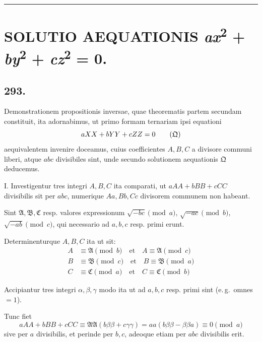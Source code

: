 \documentclass[12pt,a4paper]{article}
\theoremstyle{plain}
\theoremstyle{definition}
\theoremstyle{remark}
\begin{document}

\bigskip
\noindent\rule{\textwidth}{0.4pt}

\section*{SOLUTIO AEQUATIONIS \emph{ax}\textsuperscript{2} + \emph{by}\textsuperscript{2} + \emph{cz}\textsuperscript{2} = 0.}


\subsection*{293.}

Demonstrationem propositionis inversae, quae theorematis partem secundam
constituit, ita adornabimus, ut primo formam ternariam ipsi equationi
\begin{equation}\label{eq:Q}
aXX + bYY + cZZ = 0 \tag{$\mathfrak{Q}$}
\end{equation}
aequivalentem invenire doceamus, cuius coefficientes $A, B, C$ a divisore communi
liberi, atque $abc$ divisibiles sint, unde secundo solutionem aequationis $\mathfrak{Q}$
deducemus.

\textsc{I.} Investigentur tres integri $A, B, C$ ita comparati, ut $aAA + bBB + cCC$
divisibilis sit per $abc$, numerique $Aa, Bb, Cc$ divisorem communem non habeant.

Sint $\mathfrak{A}, \mathfrak{B}, \mathfrak{C}$ resp. valores expressionum
$\sqrt{-bc} \pmod{a}$, $\sqrt{-ac} \pmod{b}$, $\sqrt{-ab} \pmod{c}$, qui necessario ad
$a, b, c$ resp. primi erunt.

Determinenturque $A, B, C$ ita ut sit:
\begin{align*}
A &\equiv \mathfrak{A} \pmod{b} \quad\text{et}\quad A \equiv \mathfrak{A} \pmod{c} \\
B &\equiv \mathfrak{B} \pmod{c} \quad\text{et}\quad B \equiv \mathfrak{B} \pmod{a} \\
C &\equiv \mathfrak{C} \pmod{a} \quad\text{et}\quad C \equiv \mathfrak{C} \pmod{b}
\end{align*}

Accipiantur tres integri $\alpha, \beta, \gamma$ modo ita ut ad $a, b, c$ resp. primi sint
(e.\,g.\ omnes $= 1$).

Tunc fiet
\[
aAA + bBB + cCC \equiv \mathfrak{A}\mathfrak{A}(b\beta\beta + c\gamma\gamma) = aa(b\beta\beta - \beta\beta a) \equiv 0 \pmod{a}
\]
sive per $a$ divisibilis, et perinde per $b, c$, adeoque etiam per $abc$ divisibilis erit.
\end{document}
